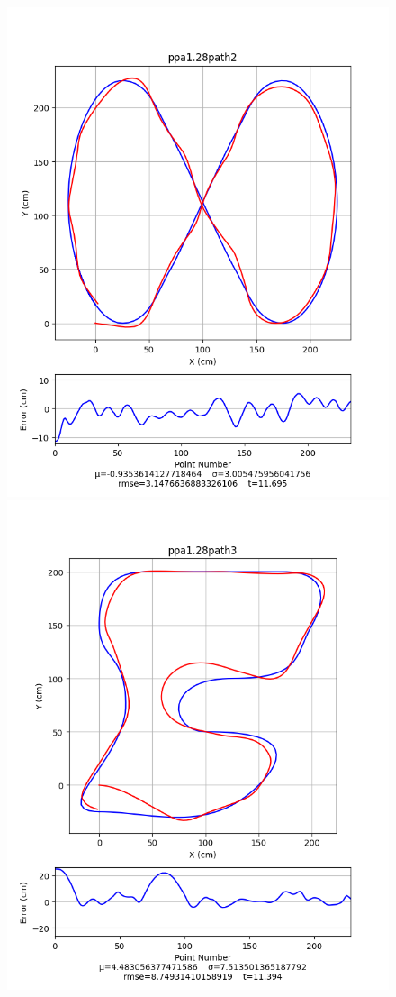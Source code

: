 \documentclass[mla8alt]{mla}
\begin{document}
\begin{paper}
\begin{figure}[H]
\includegraphics[width=\linewidth]{pathData/ppa1path2}
\endminipage\\
\includegraphics[width=\linewidth]{pathData/ppa1path3}

\end{figure}
\end{paper}
\end{document}
